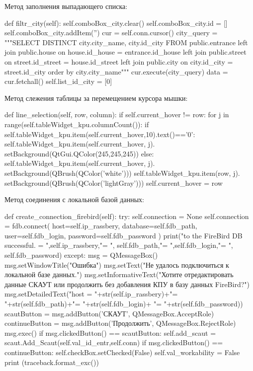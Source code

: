 \documentclass[a4paper,12pt]{article}
\begin{document}
Метод заполнения выпадающего списка:
\begin{MyCode}
def filtr_city(self):
	self.comboBox_city.clear()        
	self.comboBox_city.id = []       
	self.comboBox_city.addItem('')
	cur = self.conn.cursor()
	city_query = """SELECT DISTINCT
		city.city_name,	
		city.id_city 
		FROM    
		public.entrance	
		left join public.house
		on house.id_house = entrance.id_house
		left join public.street
		on street.id_street = house.id_street
		left join public.city
		on city.id_city = street.id_city
		order by city.city_name"""
	cur.execute(city_query)
	data = cur.fetchall()
	self.list_id_city = [0]
\end{MyCode}
Метод слежения таблицы за перемещением курсора мышки:
\begin{MyCode}
def line_selection(self, row, column):
 if self.current_hover != row:
  for j in range(self.tableWidget_kpu.columnCount()):
   if self.tableWidget_kpu.item(self.current_hover,10).text()=='0':        
    self.tableWidget_kpu.item(self.current_hover, j).
    setBackground(QtGui.QColor(245,245,245))                   
   else:
    self.tableWidget_kpu.item(self.current_hover, j).
    setBackground(QBrush(QColor('white')))
   self.tableWidget_kpu.item(row, j).
   setBackground(QBrush(QColor('lightGray')))
  self.current_hover = row	
\end{MyCode}

Метод соединения с локальной базой данных:
\begin{MyCode}
def create_connection_firebird(self):
 try:
  self.connection = None
  self.connection = fdb.connect(
  host=self.ip_rassbery,
  database=self.fdb_path,
  user=self.fdb_login,
  password=self.fdb_password
  )
  print("\nConnection to the FireBird DB successful.
  \nhost = ",self.ip_rassbery,"\nname = ",
  self.fdb_path,"\nuser = ",self.fdb_login,"\npassword = ",
  self.fdb_password)
 except:
  msg = QMessageBox()
  msg.setWindowTitle("Ошибка")
  msg.setText("Не удалось подключиться к локальной базе данных.")
  msg.setInformativeText("Хотите отредактировать данные СКАУТ 
  или продолжить без добавления КПУ в базу данных FireBird?")
  msg.setDetailedText("host = "+str(self.ip_rassbery)+"\nname =
   "+str(self.fdb_path)+"\nuser = "+str(self.fdb_login)+
   "\npassword = "+str(self.fdb_password))
  scautButton = msg.addButton('СКАУТ', QMessageBox.AcceptRole)
  continueButton = msg.addButton('Продолжить',
  QMessageBox.RejectRole)
  msg.exec()
  if msg.clickedButton() == scautButton:
   self.add_scaut = scaut.Add_Scaut(self.val_id_entr,self.conn)
  if msg.clickedButton() == continueButton:
   self.checkBox.setChecked(False)
   self.val_workability = False
  print (traceback.format_exc())
\end{MyCode}
\end{document}
